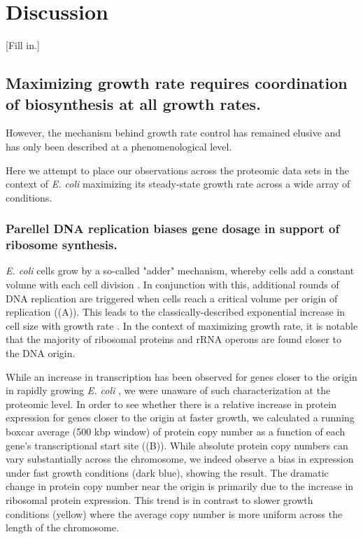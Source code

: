 \section{Discussion}

[Fill in.]



\subsection{Maximizing growth rate requires coordination of biosynthesis at all growth rates.}

However, the mechanism behind growth rate control has remained elusive
and has only been described at a phenomenological level.

Here we attempt to place our observations across the proteomic data sets in the
context of \textit{E. coli} maximizing its steady-state growth rate across a wide
array of conditions.

\subsubsection{Parellel DNA replication biases gene dosage in support of ribosome synthesis.}

\textit{E. coli} cells grow by a so-called "adder" mechanism, whereby cells add
a constant volume with each cell division \citep{taheriaraghi2015}. In
conjunction with this, additional rounds of DNA replication are triggered when
cells reach a critical volume per origin of replication
((A)). This leads to the classically-described
exponential increase in cell size with growth rate \cite{schaechter1958, si2017,
si2019}. In the context of maximizing growth rate, it is notable that the
majority of ribosomal proteins and rRNA operons are found closer to the DNA
origin.


While an increase in transcription has been observed for genes closer to the
origin in rapidly growing \textit{E. coli} \citep{scholz2019}, we were
unaware of such characterization at the proteomic level. In order to see
whether there is a relative increase in protein expression for genes closer
to the origin at faster growth, we calculated a running boxcar average (500
kbp window) of protein copy number as a function of each gene's
transcriptional start site ((B)). While absolute
protein copy numbers can vary substantially across the chromosome, we indeed
observe a bias in expression under fast growth conditions (dark blue), showing the
result. The dramatic change in protein copy number near the origin is primarily
due to the increase in ribosomal protein expression. This trend is in
contrast to slower growth conditions (yellow) where the average copy number is more
uniform across the length of the chromosome.

